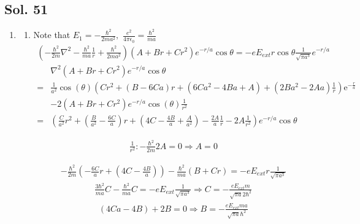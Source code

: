 \subsection*{Sol. 51}
\begin{enumerate}
    \item 
    \begin{enumerate}
        \item 
        Note that $E_1=-\frac{\hbar^2}{2ma^2},$ $\frac{e^2}{4\pi\epsilon_0}=\frac{\hbar^2}{ma}$
        \begin{align*}
        (-\frac{\hbar^2}{2m}\nabla^2-\frac{\hbar^2}{ma}\frac{1}{r}+\frac{\hbar^2}{2ma^2})
        (A+Br+Cr^2)e^{-r/a}\cos\theta=
        - eE_{ext}r\cos\theta\frac{1}{\sqrt{\pi a^3}}e^{-r/a}
        \end{align*}
        \begin{align*}
        &\nabla^2(A+Br+Cr^2)e^{-r/a}\cos\theta\\
        =&
        \frac{1}{a^2}\cos\left({\theta}\right) \left(Cr^2 + \left(B - 6Ca\right)r+ 
        \left(6Ca^{2} - 4Ba + A\right) + (2Ba^{2} - 2Aa)\frac{1}{r}\right) \mathrm{e}^{-\frac{r}{a}}\\
        &-2 (A+Br+Cr^2)e^{-r/a}\cos\left({\theta}\right) 
        \frac{1}{r^2}\\
        =&
        \left(\frac{C}{a^2}r^2 + 
        (\frac{B}{a^2}-\frac{6C}{a})
        r + 
        (4C - \frac{4B}{a} + \frac{A}{a^2})
        -\frac{2A}{a}
        \frac{1}{r} -
        2A
        \frac{1}{r^2}\right)e^{-r/a}\cos\theta 
    \end{align*}
    
    \begin{align*}
        \frac{1}{r^2}: -\frac{\hbar^2}{2m}2A=0\Rightarrow A=0
    \end{align*}
    

    \begin{align*}
        -\frac{\hbar^2}{2m}
        \left( 
        -\frac{6C}{a}
        r + 
        (4C - \frac{4B}{a})\right)
        -\frac{\hbar^2}{ma}(B+Cr)
        =-eE_{ext}r\frac{1}{\sqrt{\pi a^3}}
    \end{align*}
    \begin{align*}
        \frac{3\hbar^2}{ma}C -\frac{\hbar^2}{ma}C = 
        -eE_{ext}\frac{1}{\sqrt{\pi a^3}}\Rightarrow
        C = -\frac{eE_{ext}m}{\sqrt{\pi a}2\hbar^2}
    \end{align*}
    \begin{align*}
        (4Ca-4B)+2B =0 \Rightarrow B = -\frac{eE_{ext}ma}{\sqrt{\pi a}\hbar^2}
    \end{align*}


\end{enumerate}
\end{enumerate}
